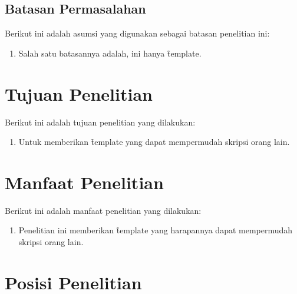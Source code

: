 \subsection{Batasan Permasalahan}
\label{sec:batasanMasalah}
Berikut ini adalah asumsi yang digunakan sebagai batasan penelitian ini:
\begin{enumerate}
	\item Salah satu batasannya adalah, ini hanya \f{template}.
\end{enumerate}



\section{Tujuan Penelitian}
\label{sec:tujuan}
Berikut ini adalah tujuan penelitian yang dilakukan:
\begin{enumerate}
	\item Untuk memberikan \f{template} yang dapat mempermudah skripsi orang lain.
\end{enumerate}



\section{Manfaat Penelitian}
\label{sec:manfaat}
Berikut ini adalah manfaat penelitian yang dilakukan:
\begin{enumerate}
	\item Penelitian ini memberikan \f{template} yang harapannya dapat mempermudah skripsi orang lain.
\end{enumerate}



\section{Posisi Penelitian}
\label{sec:posisiPenelitian}

